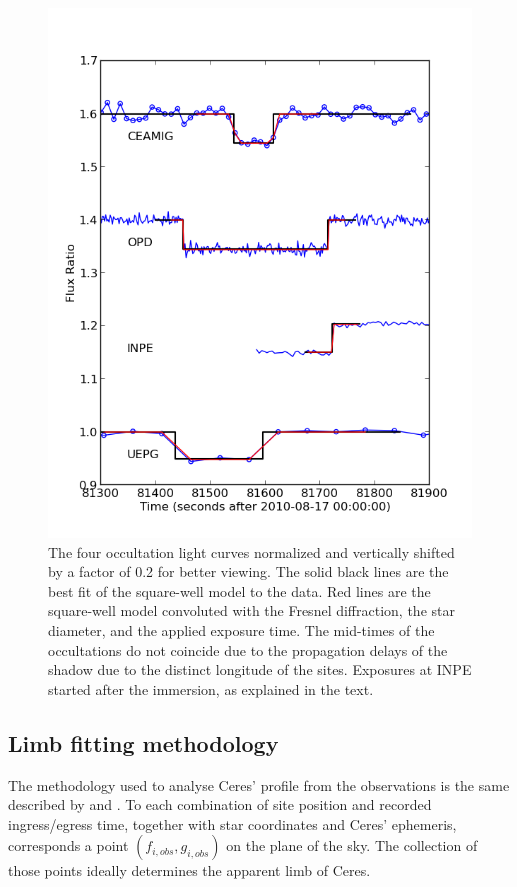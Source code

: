 \documentclass[useAMS,usenatbib]{mn2e}
\begin{document}
\begin{figure}
\includegraphics[scale=0.58]{figures/Ceres_2010_fluxratio.png} 
\caption{The four occultation light curves normalized and vertically shifted by a factor of 0.2 for better viewing. The solid black lines are the best fit of the square-well model to the data. Red lines are the square-well model convoluted with the Fresnel diffraction, the star diameter, and the applied exposure time. The mid-times of the occultations do not coincide due to the propagation delays of the shadow due to the distinct longitude of the sites. Exposures at INPE started after the immersion, as explained in the text. \label{Fig: Ceres-2010-curves}}
\end{figure}


\subsection{Limb fitting methodology} \label{Sec: limbfittingmethod}

The methodology used to analyse Ceres' profile from the observations is the same described by \cite{Sicardy2011} and \cite{BragaRibas2013}. To each combination of site position and recorded ingress/egress time, together with star coordinates and Ceres' ephemeris, corresponds a point $(f_{i,obs},g_{i,obs})$ on the plane of the sky. The collection of those points ideally determines the apparent limb of Ceres.
\end{document}
